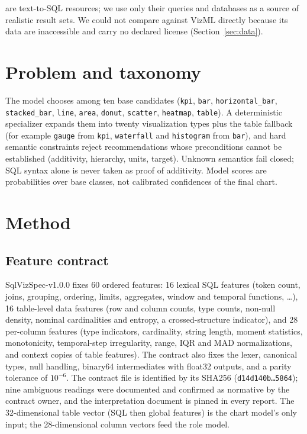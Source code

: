 \documentclass[11pt]{article}
\newcommand{\sql}[1]{\texttt{#1}}
\begin{document}
\cite{li2023bird} are text-to-SQL resources; we use only their queries and databases as a source of realistic result sets. We could not compare against VizML directly because its data are inaccessible and carry no declared license (Section~\ref{sec:data}).

\section{Problem and taxonomy}
The model chooses among ten base candidates (\sql{kpi}, \sql{bar}, \sql{horizontal\_bar}, \sql{stacked\_bar}, \sql{line}, \sql{area}, \sql{donut}, \sql{scatter}, \sql{heatmap}, \sql{table}). A deterministic specializer expands them into twenty visualization types plus the table fallback (for example \sql{gauge} from \sql{kpi}, \sql{waterfall} and \sql{histogram} from \sql{bar}), and hard semantic constraints reject recommendations whose preconditions cannot be established (additivity, hierarchy, units, target). Unknown semantics fail closed; SQL syntax alone is never taken as proof of additivity. Model scores are probabilities over base classes, not calibrated confidences of the final chart.

\section{Method}
\subsection{Feature contract}
SqlVizSpec-v1.0.0 fixes 60 ordered features: 16 lexical SQL features (token count, joins, grouping, ordering, limits, aggregates, window and temporal functions, \dots), 16 table-level data features (row and column counts, type counts, non-null density, nominal cardinalities and entropy, a crossed-structure indicator), and 28 per-column features (type indicators, cardinality, string length, moment statistics, monotonicity, temporal-step irregularity, range, IQR and MAD normalizations, and context copies of table features). The contract also fixes the lexer, canonical types, null handling, binary64 intermediates with float32 outputs, and a parity tolerance of $10^{-6}$. The contract file is identified by its SHA256 (\texttt{d14d140b\dots5864}); nine ambiguous readings were documented and confirmed as normative by the contract owner, and the interpretation document is pinned in every report. The 32-dimensional table vector (SQL then global features) is the chart model's only input; the 28-dimensional column vectors feed the role model.
\end{document}
